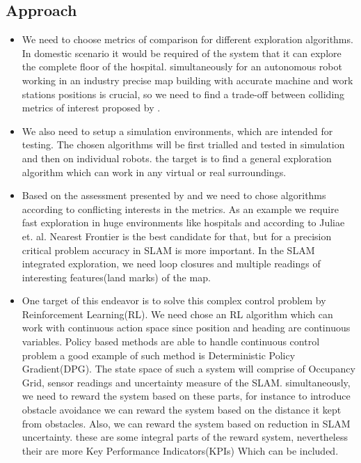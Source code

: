 \subsection{Approach}
\begin{itemize}

\item We need to choose metrics of comparison for different exploration algorithms. In domestic
scenario it would be required of the system that it can explore the complete floor of the hospital.
simultaneously for an autonomous robot working in an industry precise map building with accurate
machine and work stations positions is crucial, so we need to find a trade-off between colliding
metrics of interest proposed by \cite{Yan2015}.

\item We also need to setup a simulation environments, which are intended for testing. The chosen
algorithms will be first trialled and tested in simulation and then on individual robots. the target
is to find a general exploration algorithm which can work in any virtual or real surroundings.

\item Based on the assessment presented by \cite{Juliae2012} and \cite{Yan2015} we need to chose
algorithms according to conflicting interests in the metrics. As an example we require fast
exploration in huge environments like hospitals and according to Juliae et. al. Nearest Frontier is
the best candidate for that, but for a precision critical problem accuracy in SLAM is more
important. In the SLAM integrated exploration, we need loop closures and multiple readings of
interesting features(land marks) of the map.

 \item One target of this endeavor is to solve this complex control problem by Reinforcement
Learning(RL). We need chose an RL algorithm which can work with continuous action space since
position and heading are continuous variables. Policy based methods are able to handle continuous
control problem a good example of such method is Deterministic Policy Gradient(DPG). The state space
of such a system will comprise of Occupancy Grid, sensor readings and uncertainty measure of the
SLAM. simultaneously, we need to reward the system based on these parts, for instance to introduce
obstacle avoidance we can reward the system based on the distance it kept from obstacles. Also, we
can reward the system based on reduction in SLAM uncertainty. these are some integral parts of the
reward system, nevertheless their are more Key Performance Indicators(KPIs) Which can be included.


\end{itemize}
